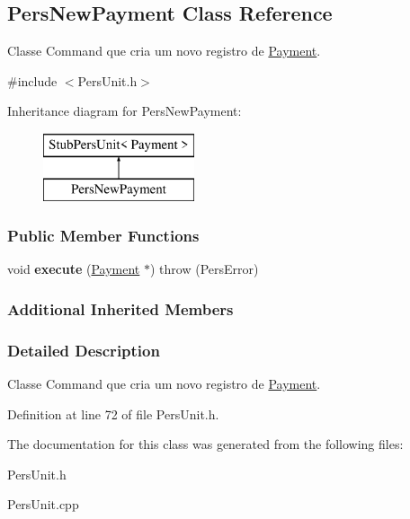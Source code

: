 \hypertarget{classPersNewPayment}{\subsection{Pers\-New\-Payment Class Reference}
\label{d5/d21/classPersNewPayment}
}


Classe Command que cria um novo registro de \hyperlink{classPayment}{Payment}.  




{\ttfamily \#include $<$Pers\-Unit.\-h$>$}

Inheritance diagram for Pers\-New\-Payment\-:\begin{figure}[H]
\begin{center}
\leavevmode
\includegraphics[height=2.000000cm]{d5/d21/classPersNewPayment}
\end{center}
\end{figure}
\subsubsection*{Public Member Functions}
\begin{DoxyCompactItemize}
\item 
\hypertarget{classPersNewPayment_adb33b781580bd87c025d15cdaeafb2f6}{void {\bfseries execute} (\hyperlink{classPayment}{Payment} $\ast$)  throw (\-Pers\-Error)}\label{d5/d21/classPersNewPayment_adb33b781580bd87c025d15cdaeafb2f6}

\end{DoxyCompactItemize}
\subsubsection*{Additional Inherited Members}


\subsubsection{Detailed Description}
Classe Command que cria um novo registro de \hyperlink{classPayment}{Payment}. 

Definition at line 72 of file Pers\-Unit.\-h.



The documentation for this class was generated from the following files\-:\begin{DoxyCompactItemize}
\item 
Pers\-Unit.\-h\item 
Pers\-Unit.\-cpp\end{DoxyCompactItemize}
